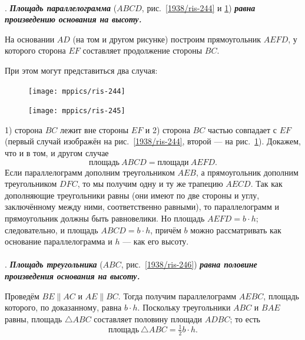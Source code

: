 \documentclass[oneside]{book}
\begin{document}
\paragraph{}\label{1938/247}
.
\textbf{\emph{Площадь параллелограмма}} ($ABCD$, рис.~\ref{1938/ris-244} и \ref{1938/ris-245}) \textbf{\emph{равна произведению основания на высоту.}}

На основании $AD$ (на том и другом рисунке) построим прямоугольник $AEFD$, у которого сторона $EF$ составляет продолжение стороны $BC$.

При этом могут представиться два случая:

\begin{figure}[h]
\begin{minipage}{.58\textwidth}
\centering
\texttt{[image: mppics/ris-244]}
\caption{}\label{1938/ris-244}
\end{minipage}
\hfill
\begin{minipage}{.38\textwidth}
\centering
\texttt{[image: mppics/ris-245]}
\caption{}\label{1938/ris-245}
\end{minipage}
\end{figure}

1) сторона $BC$ лежит вне стороны $EF$ и 2) сторона $BC$ частью совпадает с $EF$ (первый случай изображён на рис.~\ref{1938/ris-244}, второй — на рис.~\ref{1938/ris-245}).
Докажем, что и в том, и другом случае
\[\text{площадь}~ABCD = \text{площади}~AEFD.\]
Если параллелограмм дополним треугольником $AEB$, а прямоугольник дополним треугольником $DFC$, то мы получим одну и ту же трапецию $AECD$.
Так как дополняющие треугольники равны (они имеют по две стороны и углу, заключённому между ними, соответственно равными), то параллелограмм и прямоугольник должны быть равновелики.
Но площадь $AEFD=b\cdot h$;
следовательно, и площадь $ABCD=b\cdot h$, причём $b$ можно рассматривать как основание параллелограмма и $h$ — как его высоту.


\paragraph{}\label{1938/248}
.
\textbf{\emph{Площадь треугольника}} ($ABC$, рис.~\ref{1938/ris-246}) \textbf{\emph{равна половине произведения основания на высоту.}}

Проведём $BE \parallel  AC$ и $AE \parallel BC$.
Тогда получим параллелограмм $AEBC$, площадь которого, по доказанному, равна $b\cdot h$.
Поскольку треугольники $ABC$ и $BAE$ равны, площадь $\triangle ABC$ составляет половину площади $ADBC$;
то есть
\[\text{площадь}~ \triangle ABC=\tfrac12b\cdot h.\]
\end{document}
